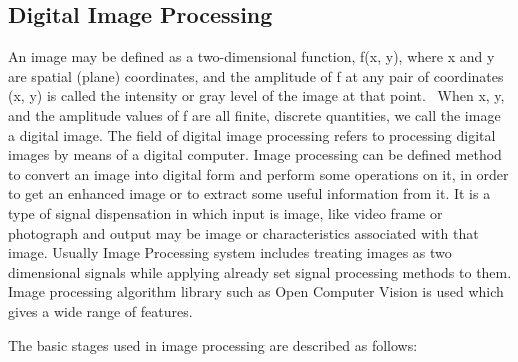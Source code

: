 \documentclass[12pt, a4paper]{article}
\begin{document}
\subsection{Digital Image Processing}
An image may be defined as a two-dimensional function, f(x, y), where x and y are spatial (plane) coordinates, and the amplitude of f at any pair of coordinates (x, y) is called the intensity or gray level of the image at that point.~\cite{raf} When x, y, and the amplitude values of f are all finite, discrete quantities, we call the image a digital image. The field of digital image processing refers to processing digital images by means of a digital computer.
Image processing can be defined method to convert an image into digital form and perform some operations on it, in order to get an enhanced image or to extract some useful information from it. It is a type of signal dispensation in which input is image, like video frame or photograph and output may be image or characteristics associated with that image. Usually Image Processing system includes treating images as two dimensional signals while applying already set signal processing methods to them. Image processing algorithm library such as Open Computer Vision is used which gives a wide range of features.

The basic stages used in image processing are described as follows:
\end{document}
